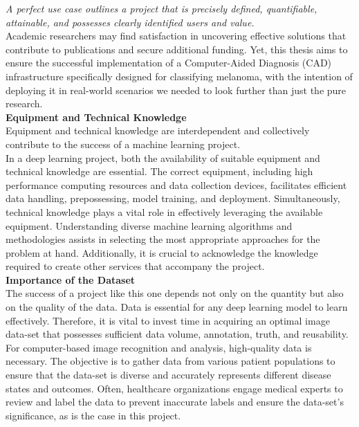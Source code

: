 \textit{A perfect use case outlines a project that is precisely defined, quantifiable, attainable, and possesses clearly identified users and value.} \\

Academic researchers may find satisfaction in uncovering effective solutions that contribute to publications
and secure additional funding. Yet, this thesis aims to ensure the successful implementation of a Computer-Aided Diagnosis (CAD)
infrastructure specifically designed for classifying melanoma,
with the intention of deploying it in real-world scenarios we needed to look further than just the pure research. \\

\vspace{0.5cm}
\textbf{Equipment and Technical Knowledge} \\

Equipment and technical knowledge are interdependent and collectively contribute to the success of a machine learning project. \\

In a deep learning project, both the availability of suitable equipment and technical knowledge are essential. The correct equipment, including high performance computing resources and data collection devices, facilitates efficient data handling, prepossessing, model training, and deployment. Simultaneously, technical knowledge plays a vital role in effectively leveraging the available equipment. Understanding diverse machine learning algorithms and methodologies assists in selecting the most appropriate approaches for the problem at hand. Additionally, it is crucial to acknowledge the knowledge required to create other services that accompany the project. \\

\vspace{0.5cm}
\textbf{Importance of the Dataset} \\

The success of a project like this one depends not only on the quantity but also on the quality of the data. Data is essential for any deep learning model to learn effectively. Therefore, it is vital to invest time in
acquiring an optimal image data-set that possesses sufficient data volume, annotation, truth, and reusability. \\

For computer-based image recognition and analysis, high-quality data is necessary. The objective is to gather data from various patient populations to ensure that the data-set is diverse and accurately represents different disease states and outcomes. Often, healthcare organizations engage medical experts to review and label the data to prevent inaccurate labels and ensure the data-set's significance, as is the case in this project.

